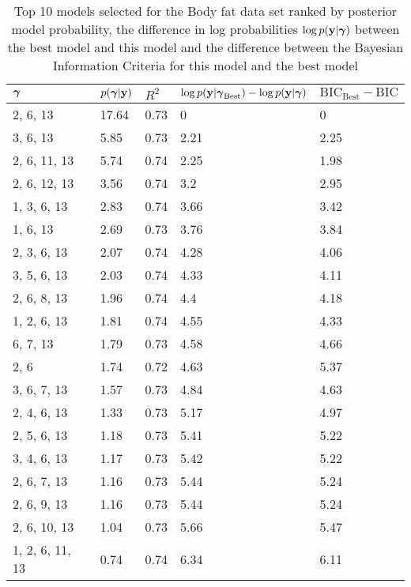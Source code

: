 \documentclass{amsart}
\begin{document}
\begin{table}
\label{tab:numerical_results_bodyfat}
\caption{Top 10 models selected for the Body fat data set ranked by posterior model probability, the difference
					in log probabilities $\log p({\bf y}|{\boldsymbol \gamma})$ between the best model and this model and the difference
					between the Bayesian Information Criteria for this model and the best model}
\begin{tabular}{|l|llll|}
\hline
${\boldsymbol \gamma}$ & $p({\boldsymbol \gamma}|{\bf y})$ & $R^2$ & $\log p({\bf y} | {\boldsymbol \gamma}_\text{Best}) - \log p({\bf y} | {\boldsymbol \gamma})$ & $\text{BIC}_\text{Best} - \text{BIC}$ \\
\hline
2, 6, 13&  17.64&  0.73&  0&  0\\
3, 6, 13&  5.85&  0.73&  2.21&  2.25\\
2, 6, 11, 13&  5.74&  0.74&  2.25&  1.98\\
2, 6, 12, 13&  3.56&  0.74&  3.2&  2.95\\
1, 3, 6, 13&  2.83&  0.74&  3.66&  3.42\\
1, 6, 13&  2.69&  0.73&  3.76&  3.84\\
2, 3, 6, 13&  2.07&  0.74&  4.28&  4.06\\
3, 5, 6, 13&  2.03&  0.74&  4.33&  4.11\\
2, 6, 8, 13&  1.96&  0.74&  4.4&  4.18\\
1, 2, 6, 13&  1.81&  0.74&  4.55&  4.33\\
6, 7, 13&  1.79&  0.73&  4.58&  4.66\\
2, 6&  1.74&  0.72&  4.63&  5.37\\
3, 6, 7, 13&  1.57&  0.73&  4.84&  4.63\\
2, 4, 6, 13&  1.33&  0.73&  5.17&  4.97\\
2, 5, 6, 13&  1.18&  0.73&  5.41&  5.22\\
3, 4, 6, 13&  1.17&  0.73&  5.42&  5.22\\
2, 6, 7, 13&  1.16&  0.73&  5.44&  5.24\\
2, 6, 9, 13&  1.16&  0.73&  5.44&  5.24\\
2, 6, 10, 13&  1.04&  0.73&  5.66&  5.47\\
1, 2, 6, 11, 13&  0.74&  0.74&  6.34&  6.11\\
\hline
\end{tabular}
\end{table}
\end{document}
